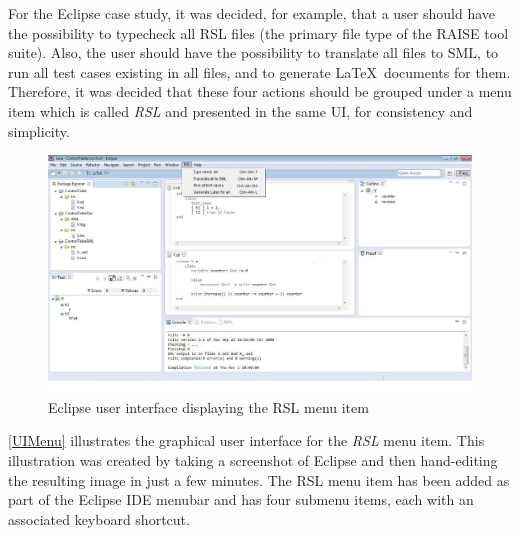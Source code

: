 \documentclass[conference]{IEEEtran}
\begin{document}
For the Eclipse case study, it was decided, for example, that a user
should have the possibility to typecheck all RSL files (the primary
file type of the RAISE tool suite). Also, the user should have the
possibility to translate all files to SML, to run all test cases
existing in all files, and to generate \LaTeX\ documents for them.
Therefore, it was decided that these four actions should be grouped
under a menu item which is called \emph{RSL} and presented in the same
UI, for consistency and simplicity.


\begin{figure}[ht!] \centering
\includegraphics[width=7in]{RSLMenu.jpeg} 
\caption{Eclipse user interface displaying the RSL menu item} 
\label{UIMenu} 
\end{figure}



\autoref{UIMenu} illustrates the graphical user interface for the
\emph{RSL} menu item. This illustration was created by taking a
screenshot of Eclipse and then hand-editing the resulting image in
just a few minutes. The RSL menu item has been added as part of the
Eclipse IDE menubar and has four submenu items, each with an associated
keyboard shortcut.
\end{document}
